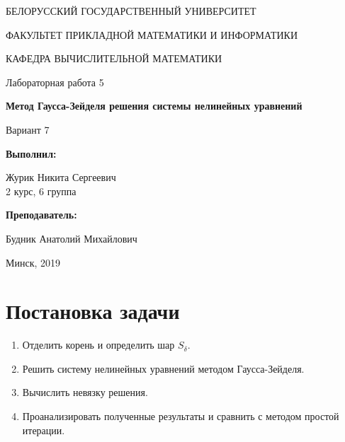 \documentclass[14pt, a4paper]{article}
\begin{document}
\begin{titlepage}
\begin{center}
\large{БЕЛОРУССКИЙ ГОСУДАРСТВЕННЫЙ УНИВЕРСИТЕТ 

ФАКУЛЬТЕТ ПРИКЛАДНОЙ МАТЕМАТИКИ И ИНФОРМАТИКИ

КАФЕДРА ВЫЧИСЛИТЕЛЬНОЙ МАТЕМАТИКИ}
\end{center}
\vspace*{\fill}
\begin{center}
Лабораторная работа 5

\large{\textbf{Метод Гаусса-Зейделя решения системы нелинейных уравнений}}

Вариант 7
\end{center}
\begin{flushright}
\textbf{Выполнил:}

Журик Никита Сергеевич \\ 2 курс, 6 группа

\textbf{Преподаватель:}

Будник Анатолий Михайлович
\end{flushright}
\vspace*{\fill}
\begin{center}
Минск, 2019
\end{center}
\end{titlepage}

\tableofcontents
\newpage

\newpage
{}

  \section{Постановка задачи}
    \begin{enumerate}
      \item
      Отделить корень и определить шар $S_{\delta}$.
      \item
      Решить систему нелинейных уравнений методом Гаусса-Зейделя.
      \item
      Вычислить невязку решения.
      \item
      Проанализировать полученные результаты и сравнить с методом простой итерации.
    \end{enumerate}
\end{document}
